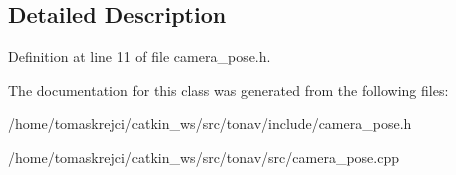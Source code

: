\subsection{Detailed Description}


Definition at line 11 of file camera\-\_\-pose.\-h.



The documentation for this class was generated from the following files\-:\begin{DoxyCompactItemize}
\item 
/home/tomaskrejci/catkin\-\_\-ws/src/tonav/include/camera\-\_\-pose.\-h\item 
/home/tomaskrejci/catkin\-\_\-ws/src/tonav/src/camera\-\_\-pose.\-cpp\end{DoxyCompactItemize}
